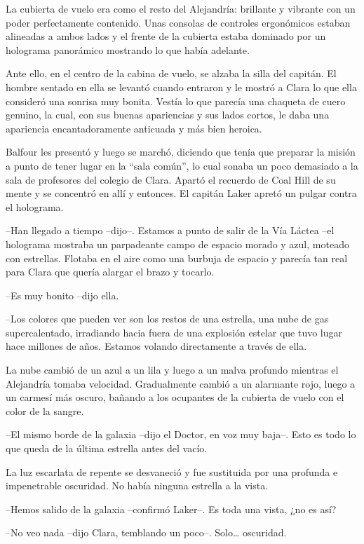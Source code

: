{La cubierta de vuelo era como el resto del Alejandría: brillante y
 vibrante con un poder perfectamente contenido. Unas consolas de
 controles ergonómicos estaban alineadas a ambos lados y el frente de la
 cubierta estaba dominado por un holograma panorámico mostrando lo que
había adelante.}

{Ante ello, en el centro de la cabina de vuelo, se alzaba la silla del
 capitán. El hombre sentado en ella se levantó cuando entraron y le
 mostró a Clara lo que ella consideró una sonrisa muy bonita. Vestía lo
 que parecía una chaqueta de cuero genuino, la cual, con sus buenas
 apariencias y sus lados cortos, le daba una apariencia encantadoramente
anticuada y más bien heroica.}

{Balfour les presentó y luego se marchó, diciendo que tenía que preparar
 la misión a punto de tener lugar en la ``sala común'', lo cual sonaba un
 poco demasiado a la sala de profesores del colegio de Clara. Apartó el
 recuerdo de Coal Hill de su mente y se concentró en allí y entonces. El
capitán Laker apretó un pulgar contra el holograma.}

{--Han llegado a tiempo --dijo--. Estamos a punto de salir de la Vía
 Láctea --el holograma mostraba un parpadeante campo de espacio morado y
 azul, moteado con estrellas. Flotaba en el aire como una burbuja de
 espacio y parecía tan real para Clara que quería alargar el brazo y
tocarlo.}

{--Es muy bonito --dijo ella.}

{--Los colores que pueden ver son los restos de una estrella, una nube de
 gas supercalentado, irradiando hacia fuera de una explosión estelar que
 tuvo lugar hace millones de años. Estamos volando directamente a través
de ella.}

{La nube cambió de un azul a un lila y luego a un malva profundo mientras
 el Alejandría tomaba velocidad. Gradualmente cambió a un alarmante rojo,
 luego a un carmesí más oscuro, bañando a los ocupantes de la cubierta de
vuelo con el color de la sangre.}

{--El mismo borde de la galaxia --dijo el Doctor, en voz muy baja--. Esto
es todo lo que queda de la última estrella antes del vacío.}

{La luz escarlata de repente se desvaneció y fue sustituida por una
 profunda e impenetrable oscuridad. No había ninguna estrella a la
vista.}

{--Hemos salido de la galaxia --confirmó Laker--. Es toda una vista, ¿no
es así?}

{--No veo nada --dijo Clara, temblando un poco--. Solo\ldots{}
oscuridad.}

